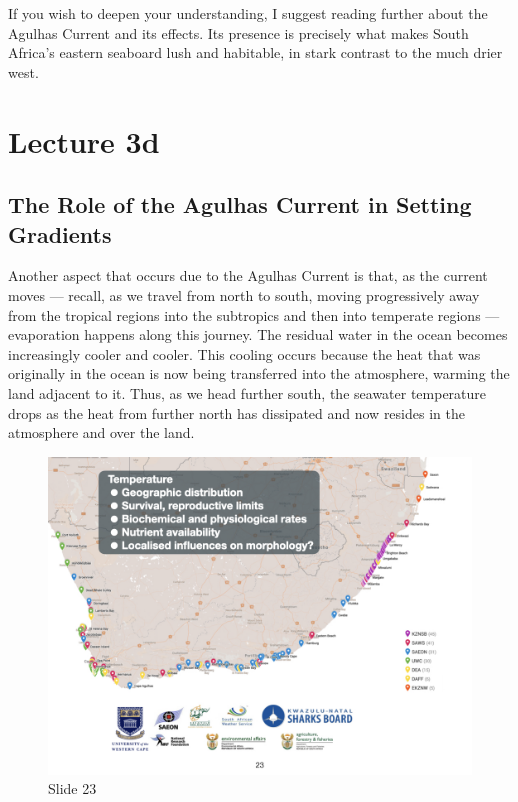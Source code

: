 \documentclass[
  10pt,
]{book}
\begin{document}
If you wish to deepen your understanding, I suggest reading further
about the Agulhas Current and its effects. Its presence is precisely
what makes South Africa's eastern seaboard lush and habitable, in stark
contrast to the much drier west.

\chapter*{Lecture 3d}\label{lecture-3d}

\section{The Role of the Agulhas Current in Setting
Gradients}\label{the-role-of-the-agulhas-current-in-setting-gradients}

Another aspect that occurs due to the Agulhas Current is that, as the
current moves --- recall, as we travel from north to south, moving
progressively away from the tropical regions into the subtropics and
then into temperate regions --- evaporation happens along this journey.
The residual water in the ocean becomes increasingly cooler and cooler.
This cooling occurs because the heat that was originally in the ocean is
now being transferred into the atmosphere, warming the land adjacent to
it. Thus, as we head further south, the seawater temperature drops as
the heat from further north has dissipated and now resides in the
atmosphere and over the land.

\begin{figure}[ht]
\centering
\includegraphics[width=0.8\linewidth]{../images/BDC334/BDC334-023.jpeg}
\caption*{Slide 23}
\end{figure}
\end{document}
